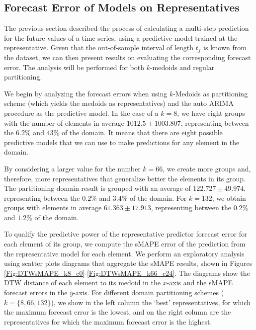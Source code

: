 \subsection{Forecast Error of Models on Representatives}
\label{Sec:AnalyzeForecastErrors}

The previous section described the process of calculating a multi-step prediction for the future values of a time series, using a predictive model trained at the representative. Given that the out-of-sample interval of length $t_f$ is known from the dataset, we can then present results on evaluating the corresponding forecast error. The analysis will be performed for both $k$-medoids and regular partitioning.

We begin by analyzing the forecast errors when using $k$-Medoids as partitioning scheme (which yields the medoids as representatives) and the auto ARIMA procedure as the predictive model. In the case of a $k=8$, we have eight groups with the number of elements in average $1012.5 \pm 1003.807$, representing between the $6.2\%$ and $43\%$ of the domain. It means that there are eight possible predictive models that we can use to make predictions for any element in the domain.

By considering a larger value for the number $k=66$, we create more groups and, therefore, more representatives that generalize better the elements in its group. The partitioning domain result is grouped with an average of $122.727 \pm 49.974$, representing between the $0.2\%$ and $3.4\%$ of the domain. For $k=132$, we obtain groups with elements in average $61.363 \pm 17.913$, representing between the $0.2\%$ and $1.2\%$ of the domain.

To qualify the predictive power of the representative predictor forecast error for each element of its group, we compute the sMAPE error of the prediction from the representative model for each element. We perform an exploratory analysis using scatter plots diagrams that aggregate the sMAPE results, shown in Figures \ref{Fig:DTWsMAPE_k8_c0}-\ref{Fig:DTWsMAPE_k66_c24}. The diagrams show the DTW distance of each element to its medoid in the $x$-axis and the sMAPE forecast errors in the $y$-axis. For different domain partitioning schemes ($k=\{8, 66, 132\}$), we show in the left column the `best' representatives, for which the maximum forecast error is the lowest, and on the right column are the representatives for which the maximum forecast error is the highest.

